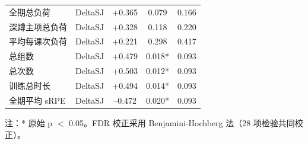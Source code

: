 \begin{table}[htbp]
\begin{threeparttable}
\begin{tabular}{llccc}
\midrule
全期总负荷        & DeltaSJ & +0.365 & 0.079 & 0.166 \\
深蹲主项总负荷    & DeltaSJ & +0.328 & 0.118 & 0.220 \\
平均每课次负荷    & DeltaSJ & +0.221 & 0.298 & 0.417 \\
总组数            & DeltaSJ & +0.479 & 0.018* & 0.093 \\
总次数            & DeltaSJ & +0.503 & 0.012* & 0.093 \\
训练总时长        & DeltaSJ & +0.494 & 0.014* & 0.093 \\
全期平均 sRPE     & DeltaSJ & --0.472 & 0.020* & 0.093 \\
\bottomrule
\end{tabular}
\begin{tablenotes}[flushleft]\footnotesize
\item 注：* 原始 p $<$ 0.05。FDR 校正采用 Benjamini-Hochberg 法（28 项检验共同校正）。
\end{tablenotes}
\end{threeparttable}
\end{table}

\clearpage
